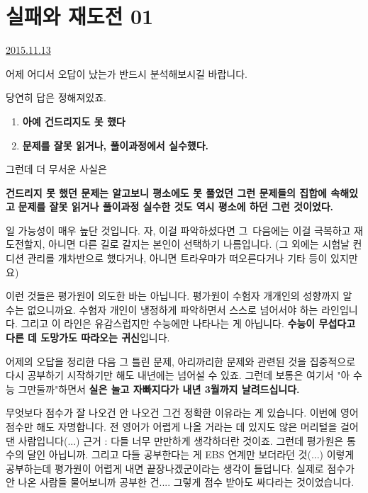 



\section{실패와 재도전 01}
\href{https://www.kockoc.com/Apoc/481466}{2015.11.13}

\vspace{5mm}

어제 어디서 오답이 났는가 반드시 분석해보시길 바랍니다.
\vspace{5mm}

당연히 답은 정해져있죠.
\vspace{5mm}
\begin{enumerate}
    \item \textbf{아예 건드리지도 못 했다}
    \item \textbf{문제를 잘못 읽거나, 풀이과정에서 실수했다.}
\end{enumerate}
\vspace{5mm}

그런데 더 무서운 사실은
\vspace{5mm}

\textbf{건드리지 못 했던 문제는 알고보니 평소에도 못 풀었던 그런 문제들의 집합에 속해있고}
\textbf{문제를 잘못 읽거나 풀이과정 실수한 것도 역시 평소에 하던 그런 것이었다.}
\vspace{5mm}

일 가능성이 매우 높단 것입니다. 자, 이걸 파악하셨다면
그 다음에는 이걸 극복하고 재도전할지, 아니면 다른 길로 갈지는 본인이 선택하기 나름입니다.
(그 외에는 시험날 컨디션 관리를 개차반으로 했다거나, 아니면 트라우마가 떠오른다거나 기타 등이 있지만요)
\vspace{5mm}

이런 것들은 평가원이 의도한 바는 아닙니다. 평가원이 수험자 개개인의 성향까지 알 수는 없으니까요.
수험자 개인이 냉정하게 파악하면서 스스로 넘어서야 하는 라인입니다.
그리고 이 라인은 유감스럽지만 수능에만 나타나는 게 아닙니다. \textbf{수능이 무섭다고 다른 데 도망가도 따라오는 귀신}입니다.
\vspace{5mm}

어제의 오답을 정리한 다음 그 틀린 문제, 아리까리한 문제와 관련된 것을 집중적으로 다시 공부하기 시작하기만 해도 내년에는 넘어설 수 있죠.
그런데 보통은 여기서 "아 수능 그만둘까"하면서 \textbf{실은 놀고 자빠지다가 내년 3월까지 날려드십니다.}
\vspace{5mm}

무엇보다 점수가 잘 나오건 안 나오건 그건 정확한 이유라는 게 있습니다.
이번에 영어점수만 해도 자명합니다. 전 영어가 어렵게 나올 거라는 데 있지도 않은 머리털을 걸어댄 사람입니다(...)
근거 : 다들 너무 만만하게 생각하더란 것이죠. 그런데 평가원은 통수의 달인 아닙니까.
그리고 다들 공부한다는 게 EBS 연계만 보더라던 것(...) 이렇게 공부하는데 평가원이 어렵게 내면 끝장나겠군이라는 생각이 들덥니다.
실제로 점수가 안 나온 사람들 물어보니까 공부한 건.... 그렇게 점수 받아도 싸다라는 것이었습니다.
\vspace{5mm}

